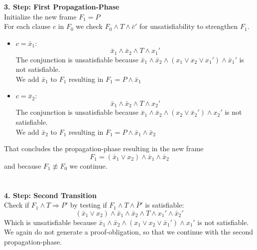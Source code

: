 \documentclass[11pt, a4paper, BCOR=10mm, ngerman]{scrbook}
\begin{document}
\textbf{3. Step: First Propagation-Phase} \\ Initialize the new frame $F_1 = P$ \\
For each clause $c$ in $F_0$ we check $F_0 \land T \land \bar c'$ for unsatisfiability to strengthen $F_1$.
\begin{itemize}
\item $c = \bar x_1:$
\begin{equation*}
\bar x_1 \land \bar x_2 \land T \land x_1'
\end{equation*}
The conjunction is unsatisfiable because $\bar x_1 \land \bar x_2 \land (x_1 \lor x_2 \lor x_1') \land \bar x_1'$ is not satisfiable.\\ We add $\bar x_1$ to $F_1$ resulting in $F_1 = P \land \bar x_1$ \\

\item$c = \bar x_2:$
\begin{equation*}
\bar x_1 \land \bar x_2 \land T \land x_2'
\end{equation*}
The conjunction is unsatisfiable because $\bar x_1 \land \bar x_2 \land (x_2 \lor \bar x_2') \land x_2'$ is not satisfiable. \\ We add $\bar x_2$ to $F_1$ resulting in $F_1 = P \land \bar x_1 \land \bar x_2$
\end{itemize}
That concludes the propagation-phase resulting in the new frame
\begin{equation*}
F_1 =(\bar x_1 \lor x_2) \land \bar x_1 \land \bar x_2
\end{equation*}
and because $F_1 \not\equiv F_0$ we continue. \\ \\ \\

\textbf{4. Step: Second Transition} \\
Check if $F_1 \land T \Rightarrow P'$ by testing if $F_1 \land T \land \bar P'$ is satisfiable: 
\begin{equation*}
(\bar x_1 \lor x_2) \land \bar x_1 \land \bar x_2 \land T \land x_1' \land \bar x_2'
\end{equation*}
Which is unsatisfiable because $\bar x_1 \land \bar x_2 \land (x_1 \lor x_2 \lor \bar x_1') \land x_1'$ is not satisfiable. We again do not generate a proof-obligation, so that we continue with the second propagation-phase. \\ \\ \par
\end{document}
